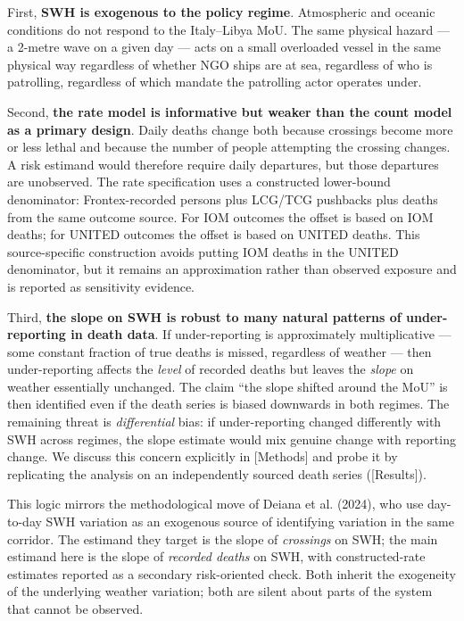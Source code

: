 \documentclass[
  11pt,
  a4paper,
]{article}
\begin{document}
First, \textbf{SWH is exogenous to the policy regime}. Atmospheric and
oceanic conditions do not respond to the Italy--Libya MoU. The same
physical hazard --- a 2-metre wave on a given day --- acts on a small
overloaded vessel in the same physical way regardless of whether NGO
ships are at sea, regardless of who is patrolling, regardless of which
mandate the patrolling actor operates under.

Second, \textbf{the rate model is informative but weaker than the count
model as a primary design}. Daily deaths change both because crossings
become more or less lethal and because the number of people attempting
the crossing changes. A risk estimand would therefore require daily
departures, but those departures are unobserved. The rate specification
uses a constructed lower-bound denominator: Frontex-recorded persons
plus LCG/TCG pushbacks plus deaths from the same outcome source. For IOM
outcomes the offset is based on IOM deaths; for UNITED outcomes the
offset is based on UNITED deaths. This source-specific construction
avoids putting IOM deaths in the UNITED denominator, but it remains an
approximation rather than observed exposure and is reported as
sensitivity evidence.

Third, \textbf{the slope on SWH is robust to many natural patterns of
under-reporting in death data}. If under-reporting is approximately
multiplicative --- some constant fraction of true deaths is missed,
regardless of weather --- then under-reporting affects the \emph{level}
of recorded deaths but leaves the \emph{slope} on weather essentially
unchanged. The claim ``the slope shifted around the MoU'' is then
identified even if the death series is biased downwards in both regimes.
The remaining threat is \emph{differential} bias: if under-reporting
changed differently with SWH across regimes, the slope estimate would
mix genuine change with reporting change. We discuss this concern
explicitly in {[}Methods{]} and probe it by replicating the analysis on
an independently sourced death series ({[}Results{]}).

This logic mirrors the methodological move of Deiana et al. (2024), who
use day-to-day SWH variation as an exogenous source of identifying
variation in the same corridor. The estimand they target is the slope of
\emph{crossings} on SWH; the main estimand here is the slope of
\emph{recorded deaths} on SWH, with constructed-rate estimates reported
as a secondary risk-oriented check. Both inherit the exogeneity of the
underlying weather variation; both are silent about parts of the system
that cannot be observed.
\end{document}
